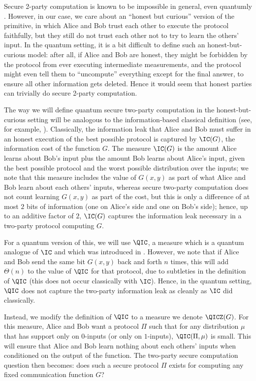 Secure 2-party computation is known to be impossible
in general, even quantumly \cite{Lo97,Col07,BCS12,FKS+13,SSS14}.
However, in our case, we care about an ``honest but curious'' version
of the primitive, in which Alice and Bob trust each other to
execute the protocol faithfully, but they still do not
trust each other not to try to learn the others' input.
In the quantum setting, it is a bit difficult to define such
an honest-but-curious model: after all, if Alice and Bob
are honest, they might be forbidden by the protocol from
ever executing intermediate measurements, and the protocol
might even tell them to ``uncompute'' everything except
for the final answer, to ensure all other information
gets deleted. Hence it would seem that honest parties can trivially
do secure 2-party computation.

The way we will define quantum secure two-party computation
in the honest-but-curious setting will be analogous
to the information-based classical definition
(see, for example, \cite{BW15}). Classically,
the information leak that Alice and Bob must suffer
in an honest execution of the best possible
protocol is captured by $\IC(G)$, the information
cost of the function $G$. The measure $\IC(G)$
is the amount Alice learns about Bob's input
plus the amount Bob learns about Alice's input,
given the best possible protocol and the worst possible
distribution over the inputs; we note that this measure
includes the value of $G(x,y)$ as part of what Alice and Bob
learn about each others' inputs, whereas secure
two-party computation does not count learning $G(x,y)$
as part of the cost, but this is only a difference of at most
$2$ bits of information (one on Alice's side and one on Bob's side);
hence, up to an additive factor of $2$, $\IC(G)$
captures the information leak necessary in a two-party
protocol computing $G$.

For a quantum version of this, we will use $\QIC$,
a measure which is a quantum analogue
of $\IC$ and which was introduced in \cite{Tou15}.
However, we note that if Alice and Bob send the same bit
$G(x,y)$ back and forth $n$ times, this will add $\Theta(n)$
to the value of $\QIC$ for that protocol, due to subtleties
in the definition of $\QIC$ (this does not occur classically
with $\IC$). Hence, in the quantum setting, $\QIC$ does not
capture the two-party information leak as cleanly as $\IC$
did classically.

Instead, we modify the definition of $\QIC$ to a measure
we denote $\QICZ(G)$.
For this measure,
Alice and Bob want a protocol $\Pi$ such that for any
distribution $\mu$ that has support only on $0$-inputs
(or only on $1$-inputs), $\QIC(\Pi,\mu)$ is small.
This will ensure that Alice and Bob learn nothing
about each others' inputs when conditioned on the output
of the function. The two-party secure
computation question then becomes:
does such a secure protocol $\Pi$ exists for computing
any fixed communication function $G$?

